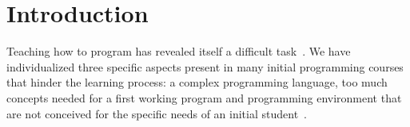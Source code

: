 \section{Introduction}
\label{sec:intro}




Teaching how to program has revealed itself a difficult task~\cite{dijkstra_89a, jenkins2002difficulty}.
We have individualized three specific aspects present in many initial programming courses that hinder  the learning process: 
a complex programming language,
too much concepts needed for a first working program and
programming environment that are not conceived for the specific needs of an initial student~\cite{singh2012}.



